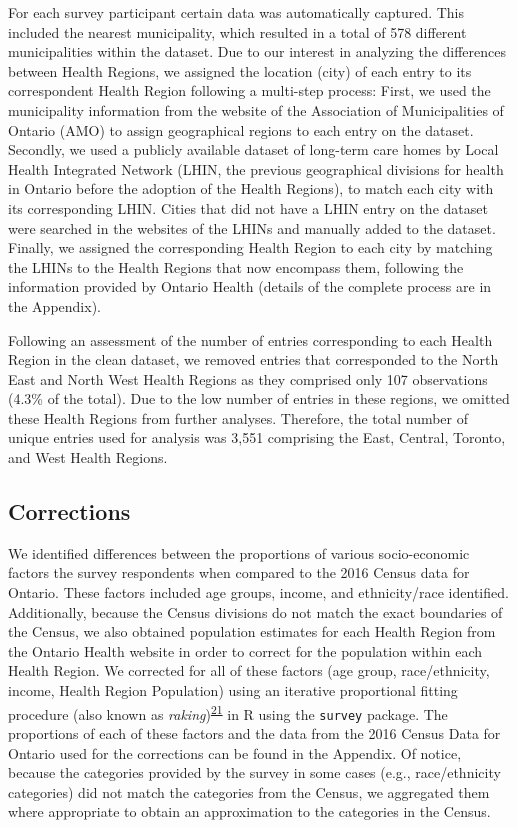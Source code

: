 \documentclass[
  letterpaper,
  DIV=11,
  numbers=noendperiod]{scrartcl}
\begin{document}
For each survey participant certain data was automatically captured.
This included the nearest municipality, which resulted in a total of 578
different municipalities within the dataset. Due to our interest in
analyzing the differences between Health Regions, we assigned the
location (city) of each entry to its correspondent Health Region
following a multi-step process: First, we used the municipality
information from the website of the Association of Municipalities of
Ontario (AMO) to assign geographical regions to each entry on the
dataset. Secondly, we used a publicly available dataset of long-term
care homes by Local Health Integrated Network (LHIN, the previous
geographical divisions for health in Ontario before the adoption of the
Health Regions), to match each city with its corresponding LHIN. Cities
that did not have a LHIN entry on the dataset were searched in the
websites of the LHINs and manually added to the dataset. Finally, we
assigned the corresponding Health Region to each city by matching the
LHINs to the Health Regions that now encompass them, following the
information provided by Ontario Health (details of the complete process
are in the Appendix).

Following an assessment of the number of entries corresponding to each
Health Region in the clean dataset, we removed entries that corresponded
to the North East and North West Health Regions as they comprised only
107 observations (4.3\% of the total). Due to the low number of entries
in these regions, we omitted these Health Regions from further analyses.
Therefore, the total number of unique entries used for analysis was
3,551 comprising the East, Central, Toronto, and West Health Regions.

\hypertarget{corrections}{%
\subsection{Corrections}\label{corrections}}

We identified differences between the proportions of various
socio-economic factors the survey respondents when compared to the 2016
Census data for Ontario. These factors included age groups, income, and
ethnicity/race identified. Additionally, because the Census divisions do
not match the exact boundaries of the Census, we also obtained
population estimates for each Health Region from the Ontario Health
website in order to correct for the population within each Health
Region. We corrected for all of these factors (age group,
race/ethnicity, income, Health Region Population) using an iterative
proportional fitting procedure (also known as
\emph{raking})\textsuperscript{\protect\hyperlink{ref-deming1940}{21}}
in R using the \texttt{survey} package. The proportions of each of these
factors and the data from the 2016 Census Data for Ontario used for the
corrections can be found in the Appendix. Of notice, because the
categories provided by the survey in some cases (e.g., race/ethnicity
categories) did not match the categories from the Census, we aggregated
them where appropriate to obtain an approximation to the categories in
the Census.
\end{document}
